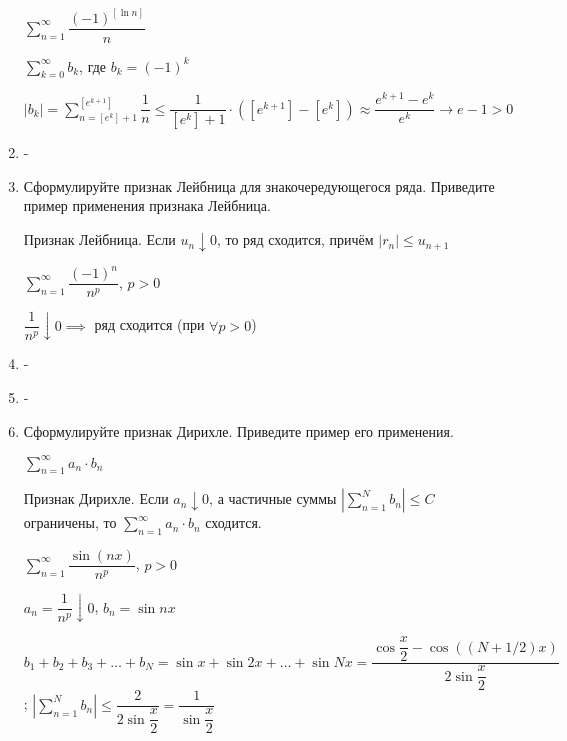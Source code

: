 \documentclass[a4paper]{article}
\begin{document}
\begin{enumerate}
        \begin{example}
            $\sum_{n=1}^{\infty} \dfrac{(-1)^{[\ln n]}}{n}$

            $\sum_{k=0}^{\infty} b_k$, где $b_k = (-1)^k$

            $|b_k| = \sum_{n=[e^k] + 1}^{[e^{k+1}]} \dfrac{1}{n} \leq \dfrac{1}{[e^k] + 1} \cdot ([e^{k+1}]-[e^k]) \approx \dfrac{e^{k+1} - e^k}{e^k} \to e - 1 > 0$
        \end{example}

        \item -
        \item Сформулируйте признак Лейбница для знакочередующегося ряда. Приведите пример применения признака Лейбница.
        
        \begin{theorem}
            Признак Лейбница. Если $u_n \downarrow 0$, то ряд сходится, причём $|r_n| \leq u_{n+1}$
            \end{theorem}
            
            \begin{example}
                $\sum_{n=1}^{\infty} \dfrac{(-1)^{n}}{n^p}$, $p > 0$
            
                $\dfrac{1}{n^p} \downarrow 0 \implies $ ряд сходится (при $\forall p > 0$)
            \end{example}

        \item -
        \item -
        
        \item Сформулируйте признак Дирихле. Приведите пример его применения.
        
        $\sum_{n=1}^{\infty}a_n \cdot b_n$

        \begin{theorem}
            Признак Дирихле. Если $a_n \downarrow 0$, а частичные суммы $\left| \sum_{n=1}^N b_n \right| \leq C$ ограничены,
            то $\sum_{n=1}^{\infty}a_n \cdot b_n$ сходится.
        \end{theorem}

        \begin{example}
            $\sum_{n=1}^{\infty} \dfrac{\sin(nx)}{n^p}$, $p > 0$
        
            $a_n = \dfrac{1}{n^p} \downarrow 0$, $b_n = \sin nx$
        
            $b_1 + b_2 + b_3 + \dots + b_N = \sin x+ \sin 2x + \dots + \sin Nx = \dfrac{\cos \dfrac{x}{2} - \cos\left((N + 1/2)x\right)}{2 \sin \dfrac{x}{2}}$; $\left|\sum_{n=1}^{N}b_n\right| \leq \dfrac{2}{2\sin{\dfrac{x}{2}}} = \dfrac{1}{\sin{\dfrac{x}{2}}}$
        

\end{example}
\end{enumerate}
\end{document}
